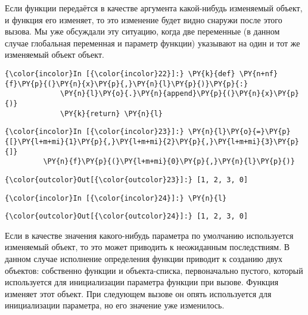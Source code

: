 Если функции передаётся в качестве аргумента какой-нибудь изменяемый
объект, и функция его изменяет, то это изменение будет видно снаружи
после этого вызова. Мы уже обсуждали эту ситуацию, когда две переменные
(в данном случае глобальная переменная и параметр функции) указывают на
один и тот же изменяемый объект объект.

    \begin{Verbatim}[commandchars=\\\{\}]
{\color{incolor}In [{\color{incolor}22}]:} \PY{k}{def} \PY{n+nf}{f}\PY{p}{(}\PY{n}{x}\PY{p}{,}\PY{n}{l}\PY{p}{)}\PY{p}{:}
             \PY{n}{l}\PY{o}{.}\PY{n}{append}\PY{p}{(}\PY{n}{x}\PY{p}{)}
             \PY{k}{return} \PY{n}{l}
\end{Verbatim}

    \begin{Verbatim}[commandchars=\\\{\}]
{\color{incolor}In [{\color{incolor}23}]:} \PY{n}{l}\PY{o}{=}\PY{p}{[}\PY{l+m+mi}{1}\PY{p}{,}\PY{l+m+mi}{2}\PY{p}{,}\PY{l+m+mi}{3}\PY{p}{]}
         \PY{n}{f}\PY{p}{(}\PY{l+m+mi}{0}\PY{p}{,}\PY{n}{l}\PY{p}{)}
\end{Verbatim}

            \begin{Verbatim}[commandchars=\\\{\}]
{\color{outcolor}Out[{\color{outcolor}23}]:} [1, 2, 3, 0]
\end{Verbatim}
        
    \begin{Verbatim}[commandchars=\\\{\}]
{\color{incolor}In [{\color{incolor}24}]:} \PY{n}{l}
\end{Verbatim}

            \begin{Verbatim}[commandchars=\\\{\}]
{\color{outcolor}Out[{\color{outcolor}24}]:} [1, 2, 3, 0]
\end{Verbatim}
        
    Если в качестве значения какого-нибудь параметра по умолчанию
используется изменяемый объект, то это может приводить к неожиданным
последствиям. В данном случае исполнение определения функции приводит к
созданию двух объектов: собственно функции и объекта-списка,
первоначально пустого, который используется для инициализации параметра
функции при вызове. Функция изменяет этот объект. При следующем вызове
он опять используется для инициализации параметра, но его значение уже
изменилось.

